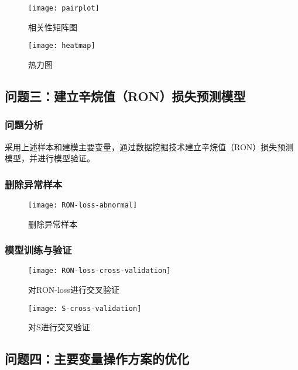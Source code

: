 \documentclass[bwprint]{gmcmthesis}
\begin{document}
\begin{figure}[htb]
	\centering
	\texttt{[image: pairplot]}
	\caption{相关性矩阵图}
\end{figure}

\begin{figure}[htb]
	\centering
	\texttt{[image: heatmap]}
	\caption{热力图}
\end{figure}


\FloatBarrier
\subsection{问题三：建立辛烷值（RON）损失预测模型}

\FloatBarrier
\subsubsection{问题分析}

采用上述样本和建模主要变量，通过数据挖掘技术建立辛烷值（RON）损失预测模型，并进行模型验证。 


\FloatBarrier
\subsubsection{删除异常样本}

\begin{figure}[htb]
	\centering
	\texttt{[image: RON-loss-abnormal]}
	\caption{删除异常样本}
\end{figure}

\FloatBarrier
\subsubsection{模型训练与验证}

\begin{figure}[htb]
	\centering
	\texttt{[image: RON-loss-cross-validation]}
	\caption{对RON-loss进行交叉验证}
\end{figure}


\begin{figure}[htb]
	\centering
	\texttt{[image: S-cross-validation]}
	\caption{对S进行交叉验证}
\end{figure}

\subsection{问题四：主要变量操作方案的优化}
\end{document}
